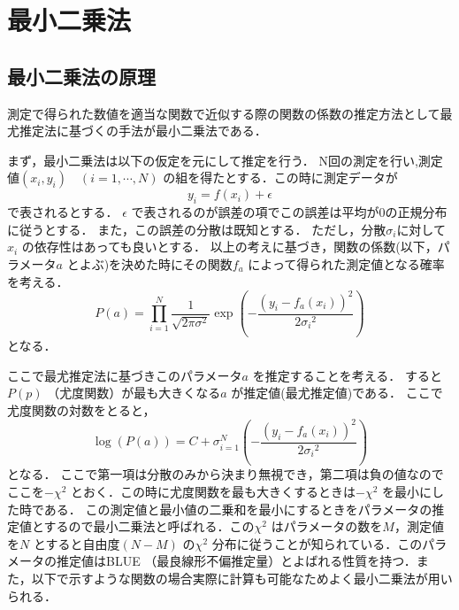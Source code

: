 \section{最小二乗法}

\subsection{最小二乗法の原理}
測定で得られた数値を適当な関数で近似する際の関数の係数の推定方法として最尤推定法に基づくの手法が最小二乗法である．

まず，最小二乗法は以下の仮定を元にして推定を行う．
N回の測定を行い,測定値$(x_i,y_i)\quad(i=1,\cdots,N)$ の組を得たとする．この時に測定データが
\begin{equation}
y_i = f(x_i) + \epsilon
\end{equation}
で表されるとする．
$\epsilon$ で表されるのが誤差の項でこの誤差は平均が0の正規分布に従うとする．
また，この誤差の分散は既知とする．
ただし，分散$\sigma_i$に対して$x_i$ の依存性はあっても良いとする．
以上の考えに基づき，関数の係数(以下，パラメータ$a$ とよぶ)を決めた時にその関数$f_a$ によって得られた測定値となる確率を考える．
\begin{equation}
P(a) = \prod_{i=1}^N \frac{1}{\sqrt{2\pi\sigma^2}}\exp\left(-\frac{(y_i-f_a(x_i))^2}{2{\sigma_i}^2}\right)
\end{equation}
となる．

ここで最尤推定法に基づきこのパラメータ$a$ を推定することを考える．
すると$P(p)$ （尤度関数）が最も大きくなる$a$ が推定値(最尤推定値)である．
ここで尤度関数の対数をとると，
\begin{equation}
  \log(P(a)) = C + \sigma_{i=1}^N \left(-\frac{(y_i-f_a(x_i))^2}{2{\sigma_i}^2}\right)
\end{equation}
となる．
ここで第一項は分散のみから決まり無視でき，第二項は負の値なのでここを$-\chi^2$ とおく．この時に尤度関数を最も大きくするときは$-\chi^2$ を最小にした時である．
この測定値と最小値の二乗和を最小にするときをパラメータの推定値とするので最小二乗法と呼ばれる．この$\chi^2$ はパラメータの数を$M$，測定値を$N$ とすると自由度$(N-M)$ の$\chi^2$ 分布に従うことが知られている．このパラメータの推定値はBLUE （最良線形不偏推定量）とよばれる性質を持つ．また，以下で示すような関数の場合実際に計算も可能なためよく最小二乗法が用いられる．

